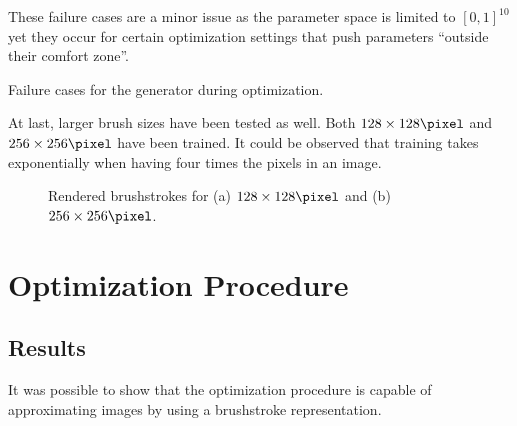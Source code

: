 These failure cases are a minor issue as the parameter space is limited to $[0, 1]^10$ yet they occur for certain optimization settings that push parameters ``outside their comfort zone''.\\

\begin{marginfigure}
    \caption{Failure cases for the generator during optimization.}
\end{marginfigure}
At last, larger brush sizes have been tested as well.
Both $128\times128 \si{\pixel}$ and $256\times256 \si{\pixel}$ have been trained.
It could be observed that training takes exponentially when having four times the pixels in an image.
\begin{figure}
    \qquad
    \caption{Rendered brushstrokes for (a) $128\times128 \si{\pixel}$ and (b) $256\times256 \si{\pixel}$.}
\end{figure}

\section{Optimization Procedure}
\subsection{Results}
It was possible to show that the optimization procedure is capable of approximating images by using a brushstroke representation.

